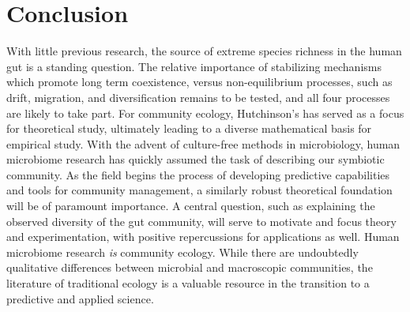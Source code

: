 \documentclass[12pt]{article}
\begin{document}
\section{Conclusion}
With little previous research, the source of extreme species richness
in the human gut is a standing question.
The relative importance of stabilizing mechanisms which promote
long term coexistence, versus non-equilibrium processes, such as
drift, migration, and  diversification remains to be tested,
and all four processes are likely to take part.
For community ecology, Hutchinson's  has
served as a focus for theoretical study,
ultimately leading to a diverse mathematical basis for empirical
study.
With the advent of culture-free methods in microbiology,
human microbiome research has quickly assumed the task of describing
our symbiotic community.
As the field begins the process of developing predictive capabilities
and tools for community management,
a similarly robust theoretical foundation will be of paramount
importance.
A central question, such as explaining the observed
diversity of the gut community, will serve to motivate and focus
theory and experimentation, with positive repercussions for
applications as well.
Human microbiome research \emph{is} community ecology.
While there are undoubtedly qualitative differences between
microbial and macroscopic communities, the literature of traditional
ecology is a valuable resource in the transition to a predictive
and applied science.



\end{document}
